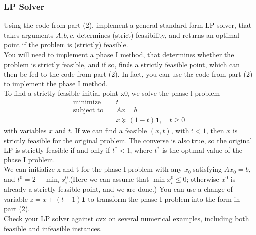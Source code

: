 \subsubsection{LP Solver}
Using the code from part (2), implement a general standard form LP
solver, that takes arguments $A, b, c$, determines (strict) feasibility, and returns an
optimal point if the problem is (strictly) feasible. \\
You will need to implement a phase I method, that determines whether the problem
is strictly feasible, and if so, finds a strictly feasible point, which can then be fed to
the code from part (2). In fact, you can use the code from part (2) to implement the
phase I method. \\
To find a strictly feasible initial point x0, we solve the phase I problem
\begin{align}
  \text{minimize} & \quad t \\
  \text{subject to} & \quad Ax =b \\
  & \quad x \succeq (1-t) \textbf{1}, \quad t \geq 0
\end{align}
with variables $x$ and $t$. If we can find a feasible $(x, t)$, with $t < 1$, then $x$ is strictly
feasible for the original problem. The converse is also true, so the original LP is strictly
feasible if and only if $t^* < 1$, where $t^*$
is the optimal value of the phase I problem. \\
We can initialize x and t for the phase I problem with any $x_0$
satisfying $Ax_0 = b$, and $t^0 = 2 - \min_i x_i^0$.(Here we can assume that $\min x_i^0 \leq 0$; otherwise $x^0$ is already a strictly feasible point, and we are done.)
You can use a change of variable $z= x + (t - 1) \textbf{1}$ to
transform the phase I problem into the form in part (2). \\
Check your LP solver against cvx on several numerical examples, including both feasible and infeasible instances.